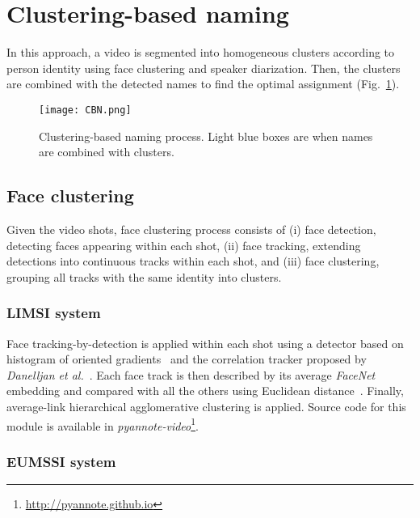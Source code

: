\section{Clustering-based naming}
\label{sec:clustering}

In this approach, a video is segmented into homogeneous clusters according to person identity using face clustering and speaker diarization. Then, the clusters are combined with the detected names to find the optimal assignment (Fig.~\ref{fig:cbn}).

\begin{figure}[!htb]
 \centering
 \texttt{[image: CBN.png]}
\vspace*{-5mm}
 \caption{Clustering-based naming process. Light blue boxes are when names are combined with clusters.}
\vspace*{-5mm}
 \label{fig:cbn}
\end{figure}

\subsection{Face clustering}

Given the video shots, face clustering process consists of (i) face detection, detecting faces appearing within each shot, (ii) face tracking, extending detections into continuous tracks within each shot, and (iii) face clustering, grouping all tracks with the same identity into clusters.

\subsubsection{LIMSI system}

Face tracking-by-detection is applied within each shot using a detector based on histogram of oriented gradients~\cite{Dalal2005} and the correlation tracker proposed by \emph{Danelljan et al.}~\cite{Danelljan2014}. 
%
Each face track is then described by its average \emph{FaceNet} embedding and compared with all the others using Euclidean distance~\cite{Schroff2015}. 
%
Finally, average-link hierarchical agglomerative clustering is applied. Source code for this module is available in \emph{pyannote-video}\footnote{\url{http://pyannote.github.io}}.

\subsubsection{EUMSSI system}

